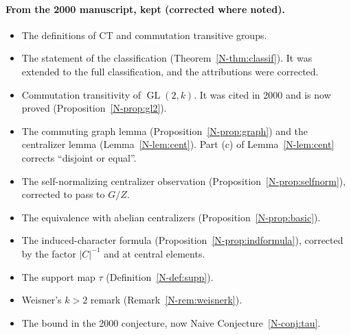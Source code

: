 \documentclass[12pt,letterpaper]{article}
\DeclareMathOperator{\GL}{GL}
\begin{document}
\paragraph{From the 2000 manuscript, kept (corrected where noted).}
\begin{itemize}[itemsep=1pt]
\item The definitions of CT and commutation transitive groups.
\item The statement of the classification (Theorem~\ref{N-thm:classif}). It
  was extended to the full classification, and the attributions were
  corrected.
\item Commutation transitivity of $\GL(2,k)$. It was cited in 2000 and is
  now proved (Proposition~\ref{N-prop:gl2}).
\item The commuting graph lemma (Proposition~\ref{N-prop:graph}) and the
  centralizer lemma (Lemma~\ref{N-lem:cent}). Part (c) of
  Lemma~\ref{N-lem:cent} corrects ``disjoint or equal''.
\item The self-normalizing centralizer observation
  (Proposition~\ref{N-prop:selfnorm}), corrected to pass to $G/Z$.
\item The equivalence with abelian centralizers
  (Proposition~\ref{N-prop:basic}).
\item The induced-character formula (Proposition~\ref{N-prop:indformula}),
  corrected by the factor $|C|^{-1}$ and at central elements.
\item The support map $\tau$ (Definition~\ref{N-def:supp}).
\item Weisner's $k>2$ remark (Remark~\ref{N-rem:weisnerk}).
\item The bound in the 2000 conjecture, now Naive
  Conjecture~\ref{N-conj:tau}.
\end{itemize}
\end{document}
